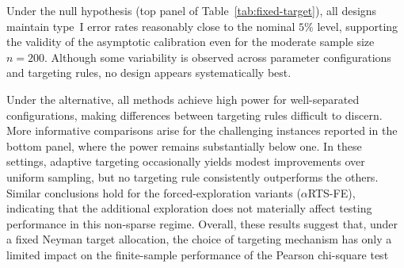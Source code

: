 Under the null hypothesis (top panel of Table~\ref{tab:fixed-target}),
	all designs maintain type~I error rates reasonably close to the nominal
	\(5\%\) level, supporting the validity of the asymptotic calibration even
	for the moderate sample size \(n=200\). Although some variability is
	observed across parameter configurations and targeting rules, no design
	appears systematically best.
	
	Under the alternative, all methods achieve high power for well-separated configurations, making differences between targeting rules difficult to discern. More informative comparisons arise for the challenging instances reported in the bottom panel, where the power remains substantially below one. In these settings, adaptive targeting occasionally yields modest
	improvements over uniform sampling, but no targeting rule consistently outperforms the others. Similar conclusions hold for the forced-exploration variants (\(\alpha\)RTS-FE), indicating that the
	additional exploration does not materially affect testing performance in this non-sparse regime.	Overall, these results suggest that, under a fixed Neyman target allocation, the choice of targeting mechanism has only a limited impact on the finite-sample performance of the Pearson chi-square test






